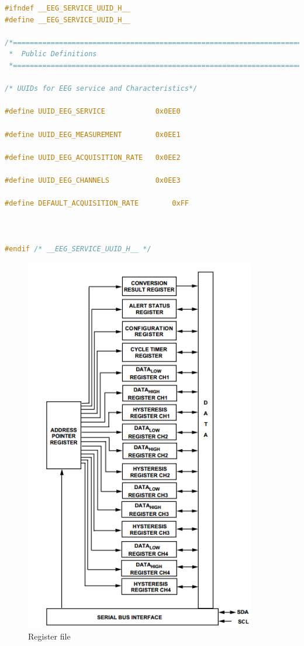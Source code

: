 \documentclass[]{article}
\begin{document}
\begin{lstlisting}[language=C, caption=UUIDs EEG service,label={lst:eeguuid}]
#ifndef __EEG_SERVICE_UUID_H__
#define __EEG_SERVICE_UUID_H__

/*============================================================================*
 *  Public Definitions
 *============================================================================*/

/* UUIDs for EEG service and Characteristics*/

#define UUID_EEG_SERVICE			0x0EE0

#define UUID_EEG_MEASUREMENT		0x0EE1

#define UUID_EEG_ACQUISITION_RATE	0x0EE2

#define UUID_EEG_CHANNELS			0x0EE3

#define DEFAULT_ACQUISITION_RATE		0xFF



#endif /* __EEG_SERVICE_UUID_H__ */
\end{lstlisting}


\begin{figure}[H]
	\begin{center}
		\includegraphics[width = 0.9\textwidth]{regs}
	\end{center}
	\caption{Register file}
	\label{fig:regs}
\end{figure}
\end{document}

